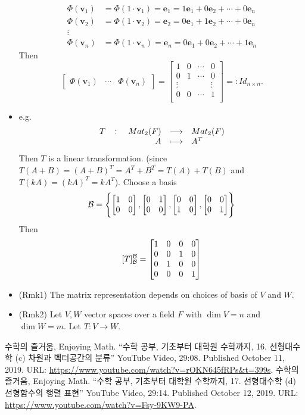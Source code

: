 \documentclass[11pt,openany]{article}
\renewcommand{\vec}[1]{\mathbf{#1}}
\begin{document}
\begin{itemize}
\begin{align*}
	\Phi(\vec{v}_1)&=\Phi(1\cdot\vec{v}_1)=\vec{e}_1=1\vec{e}_1+0\vec{e}_2+\cdots+0\vec{e}_n\\
	\Phi(\vec{v}_2)&=\Phi(1\cdot\vec{v}_2)=\vec{e}_2=0\vec{e}_1+1\vec{e}_2+\cdots+0\vec{e}_n\\
	\vdots &\\
	\Phi(\vec{v}_n)&=\Phi(1\cdot\vec{v}_n)=\vec{e}_n=0\vec{e}_1+0\vec{e}_2+\cdots+1\vec{e}_n
	\end{align*} Then \[
\begin{bmatrix}
\Phi(\vec{v}_1)& \cdots & \Phi(\vec{v}_n)
\end{bmatrix}=\begin{bmatrix}
1 & 0 & \cdots & 0\\
0 & 1 & \cdots & 0\\
\vdots & & &\vdots  \\
0 & 0 & \cdots & 1\\
\end{bmatrix}=:Id_{n\times n}.
\]
\item e.g. \[
\fullfunction{T}{Mat_{2}(F)}{Mat_2(F)}{A}{A^T}
\] Then $T$ is a linear transformation. (since $T(A+B)=(A+B)^T=A^T+B^T=T(A)+T(B)$ and $T(kA)=(kA)^T=kA^T$). Choose a basis \[
\mathcal{B}=\set{\begin{bmatrix}
	1 & 0 \\ 0 & 0
\end{bmatrix}, \begin{bmatrix}
0 & 1 \\ 0 & 0
\end{bmatrix}, \begin{bmatrix}
0 & 0 \\ 1 & 0
\end{bmatrix}, \begin{bmatrix}
0 & 0 \\ 0 & 1
\end{bmatrix}}
\] Then \[
[T]_{\mathcal{B}}^{\mathcal{B}}=\begin{bmatrix}
	1 & 0 & 0 & 0 \\
	0 & 0 & 1 & 0 \\
	0 & 1 & 0 & 0 \\
	0 & 0 & 0 & 1
\end{bmatrix}
\]
\item (Rmk1) The matrix representation depends on choices of basis of $V$ and $W$.
\item (Rmk2) Let $V,W$ vector spaces over a field $F$ with $\dim V=n$ and $\dim W=m$. Let $T:V\to W$.
\end{itemize}
\fi


\vfill
\begin{thebibliography}{9}
	수학의 즐거움, Enjoying Math. ``수학 공부, 기초부터 대학원 수학까지, 16. 선형대수학 (c) 차원과 벡터공간의 분류'' YouTube Video, 29:08. Published 
	October 11, 2019. URL: \url{https://www.youtube.com/watch?v=rOKN645fRPs&t=399s}.
	수학의 즐거움, Enjoying Math. ``수학 공부, 기초부터 대학원 수학까지, 17. 선형대수학 (d) 선형함수의 행렬 표현'' YouTube Video, 29:14. Published 
	October 12, 2019. URL: \url{https://www.youtube.com/watch?v=Fsy-9KW9-PA}.
\end{thebibliography}
\end{document}
